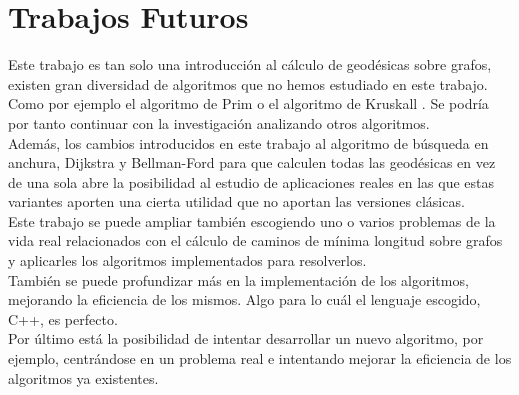 \section{Trabajos Futuros}

Este trabajo es tan solo una introducción al cálculo de geodésicas sobre grafos, existen gran diversidad de algoritmos que no hemos estudiado en este trabajo. Como por ejemplo el algoritmo de Prim \cite{6773228} o el algoritmo de Kruskall \cite{fc0df122-3305-33a8-bac5-7a6fc3666dfb}. Se podría por tanto continuar con la investigación analizando otros algoritmos. \\

Además, los cambios introducidos en este trabajo al algoritmo de búsqueda en anchura, Dijkstra y Bellman-Ford para que calculen todas las geodésicas en vez de una sola abre la posibilidad al estudio de aplicaciones reales en las que estas variantes aporten una cierta utilidad que no aportan las versiones clásicas. \\

Este trabajo se puede ampliar también escogiendo uno o varios problemas de la vida real relacionados con el cálculo de caminos de mínima longitud sobre grafos y aplicarles los algoritmos implementados para resolverlos. \\

También se puede profundizar más en la implementación de los algoritmos, mejorando la eficiencia de los mismos. Algo para lo cuál el lenguaje escogido, C++, es perfecto. \\

Por último está la posibilidad de intentar desarrollar un nuevo algoritmo, por ejemplo, centrándose en un problema real e intentando mejorar la eficiencia de los algoritmos ya existentes.

\endinput



